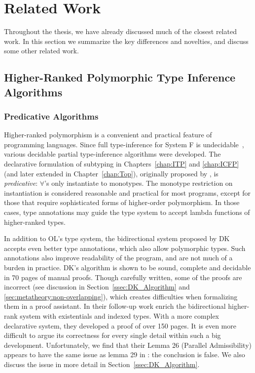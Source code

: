 \chapter{Related Work}
\label{chap:related}

Throughout the thesis, we have already discussed much of the closest related work.
In this section we summarize the key differences and novelties,
and discuss some other related work.

\section{Higher-Ranked Polymorphic Type Inference Algorithms}

\subsection{Predicative Algorithms}

Higher-ranked polymorphism is a convenient and practical feature of
programming languages.  Since full type-inference for System F is
undecidable~\citep{wells1999typability}, various decidable partial
type-inference algorithms were developed.
The declarative formulation of subtyping in Chapters~\ref{chap:ITP} and \ref{chap:ICFP}
(and later extended in Chapter~\ref{chap:Top}),
originally proposed by \citet{odersky1996putting}, is \emph{predicative}:
$\forall$'s only instantiate to monotypes.  The monotype restriction
on instantiation is considered reasonable and practical for most
programs, except for those that require sophisticated forms of
higher-order polymorphism.
In those cases, type annotations may guide the type system to
accept lambda functions of higher-ranked types.

In addition to OL's type system,
the bidirectional system proposed by DK~\citep{dunfield2013complete}
accepts even better type annotations, which also allow polymorphic types.
Such annotations also improve readability of the program,
and are not much of a burden in practice.
DK's algorithm is shown to be sound, complete and decidable in 70 pages of manual proofs.
Though carefully written, some of the proofs are incorrect
(see discussion in Section~\ref{ssec:DK_Algorithm} and
\ref{sec:metatheory:non-overlapping}),
which creates difficulties when formalizing them in a proof assistant.
In their follow-up work \citet{DunfieldIndexed} enrich the bidirectional higher-rank system with
existentials and indexed types.
With a more complex declarative system, they developed a proof of over 150 pages.
It is even more difficult to argue its correctness for every single detail
within such a big development.
Unfortunately, we find that their Lemma 26 (Parallel Admissibility) appears to have the same issue 
as lemma 29 in \citep{dunfield2013complete}: the conclusion is false. We also discuss
the issue in more detail in Section~\ref{ssec:DK_Algorithm}.

